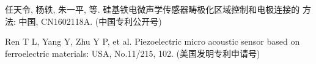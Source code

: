 \begin{resume}
  \begin{achievements}
    \item 任天令, 杨轶, 朱一平, 等. 硅基铁电微声学传感器畴极化区域控制和电极连接的
      方法: 中国, CN1602118A. (中国专利公开号)
    \item Ren T L, Yang Y, Zhu Y P, et al. Piezoelectric micro acoustic sensor
      based on ferroelectric materials: USA, No.11/215, 102. (美国发明专利申请号)
  \end{achievements}

\end{resume}
